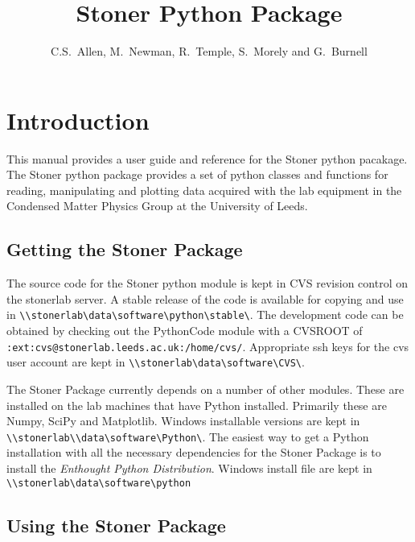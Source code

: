 \documentclass[a4paper,11pt]{scrartcl}
\author{C.S.~Allen, M.~Newman, R.~Temple, S.~Morely  and G.~Burnell}
\title{Stoner Python Package}
\begin{document}
\maketitle

\tableofcontents
\newpage
\pagestyle{scrheadings} 
\ifoot[\today]{\today}



  \section{Introduction}

This manual provides a user guide and reference for the Stoner python pacakage.
The Stoner python package provides a set of python classes and functions for
reading, manipulating and plotting data acquired with the lab equipment in the
Condensed Matter Physics Group at the University of Leeds.

\subsection{Getting the Stoner Package}

The source code for the Stoner python module is kept in CVS revision control on
the stonerlab server. A stable release of the code is available for copying and
use in \verb#\\stonerlab\data\software\python\stable\#. The development code can
be obtained by checking out the PythonCode module with a CVSROOT of \\
\verb#:ext:cvs@stonerlab.leeds.ac.uk:/home/cvs/#. Appropriate ssh keys for the
cvs user account are kept in \verb#\\stonerlab\data\software\CVS\#.

The Stoner Package currently depends on a number of other modules. These are
installed on the lab machines that have Python installed. Primarily these are
Numpy, SciPy and Matplotlib. Windows installable versions are kept in \\
\verb#\\stonerlab\\data\software\Python\#.  The easiest way to get a Python
installation with all the necessary dependencies for the Stoner Package is to
install the \textit{Enthought Python Distribution}. Windows install file are
kept in \verb#\\stonerlab\data\software\python#


\subsection{Using the Stoner Package}
\end{document}
